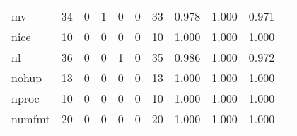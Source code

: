 \begin{longtable}{lp{1.2cm}p{1.2cm}p{1.2cm}p{1.2cm}p{1.2cm}p{1.2cm}p{1.2cm}p{1.2cm}p{1.2cm}p{1.2cm}}
mv        &                                    34 &                                                  0 &                                                  1 &                                                  0 &                                                  0 &                                                 33 &                                              0.978 &                                              1.000 &                                              0.971 \\
nice      &                                    10 &                                                  0 &                                                  0 &                                                  0 &                                                  0 &                                                 10 &                                              1.000 &                                              1.000 &                                              1.000 \\
nl        &                                    36 &                                                  0 &                                                  0 &                                                  1 &                                                  0 &                                                 35 &                                              0.986 &                                              1.000 &                                              0.972 \\
nohup     &                                    13 &                                                  0 &                                                  0 &                                                  0 &                                                  0 &                                                 13 &                                              1.000 &                                              1.000 &                                              1.000 \\
nproc     &                                    10 &                                                  0 &                                                  0 &                                                  0 &                                                  0 &                                                 10 &                                              1.000 &                                              1.000 &                                              1.000 \\
numfmt    &                                    20 &                                                  0 &                                                  0 &                                                  0 &                                                  0 &                                                 20 &                                              1.000 &                                              1.000 &                                              1.000 \\

\end{longtable}

